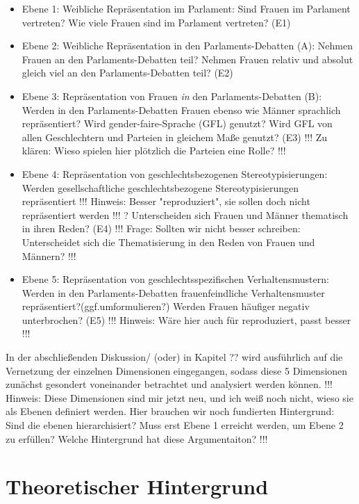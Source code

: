\documentclass[12pt, 
    twoside=false, 
    bibliography=totoc, 
    numbers=endperiod, 
    headings=normal, 
    toc=chapterentrydotfill
    ]{scrbook}
\begin{document}
\begin{itemize}
    \item Ebene 1: Weibliche Repräsentation im Parlament: Sind Frauen im Parlament vertreten? Wie viele Frauen sind im Parlament vertreten? (E1)
    \item Ebene 2: Weibliche Repräsentation in den Parlaments-Debatten (A): Nehmen Frauen an den Parlaments-Debatten teil? Nehmen Frauen relativ und absolut gleich viel an den Parlaments-Debatten teil? (E2)
    \item Ebene 3: Repräsentation von Frauen \emph{in} den Parlaments-Debatten (B): Werden in den Parlaments-Debatten Frauen ebenso wie Männer sprachlich repräsentiert? Wird gender-faire-Sprache (GFL) genutzt? Wird GFL von allen Geschlechtern und Parteien in gleichem Maße genutzt? (E3) !!! Zu klären: Wieso spielen hier plötzlich die Parteien eine Rolle? !!!
    \item Ebene 4: Repräsentation von geschlechtsbezogenen Stereotypisierungen: Werden gesellschaftliche geschlechtsbezogene Stereotypisierungen repräsentiert !!! Hinweis: Besser "reproduziert", sie sollen doch nicht repräsentiert werden !!! ? Unterscheiden sich Frauen und Männer thematisch in ihren Reden? (E4) !!! Frage: Sollten wir nicht besser schreiben: Unterscheidet sich die Thematisierung in den Reden von Frauen und Männern? !!!
    \item Ebene 5: Repräsentation von geschlechtsspezifischen Verhaltensmustern: Werden in den Parlaments-Debatten frauenfeindliche Verhaltensmuster repräsentiert?(ggf.umformulieren?) Werden Frauen häufiger negativ unterbrochen? (E5) !!! Hinweis: Wäre hier auch für reproduziert, passt besser !!!
\end{itemize}

In der abschließenden Diskussion/ (oder) in Kapitel ?? wird ausführlich auf die Vernetzung der einzelnen Dimensionen eingegangen, sodass diese 5 Dimensionen zunächst gesondert voneinander betrachtet und analysiert werden können. !!! Hinweis: Diese Dimensionen sind mir jetzt neu, und ich weiß noch nicht, wieso sie als Ebenen definiert werden. Hier brauchen wir noch fundierten Hintergrund: Sind die ebenen hierarchisiert? Muss erst Ebene 1 erreicht werden, um Ebene 2 zu erfüllen? Welche Hintergrund hat diese Argumentaiton? !!!


\chapter{Theoretischer Hintergrund}
\end{document}
